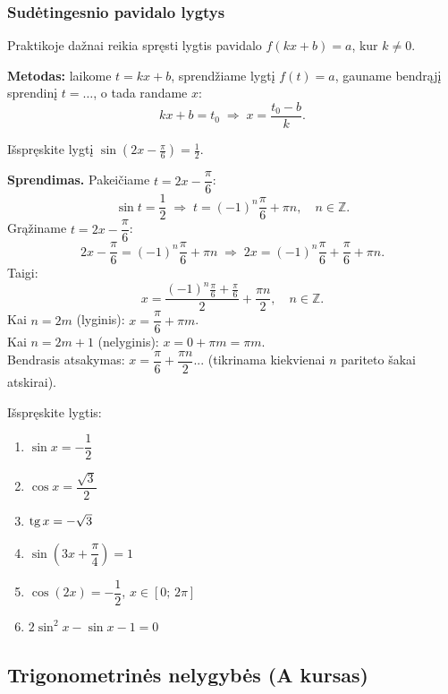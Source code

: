 \subsubsection*{Sudėtingesnio pavidalo lygtys}

Praktikoje dažnai reikia spręsti lygtis pavidalo $f(kx + b) = a$, kur $k \neq 0$.

\noindent \textbf{Metodas:} laikome $t = kx + b$, sprendžiame lygtį $f(t) = a$, 
gauname bendrąjį sprendinį $t = \ldots$, o tada randame $x$:
\[
    kx + b = t_0 \;\Rightarrow\; x = \frac{t_0 - b}{k}.
\]

\begin{example}
Išspręskite lygtį $\sin(2x - \frac{\pi}{6}) = \frac{1}{2}$.

\textbf{Sprendimas.} Pakeičiame $t = 2x - \dfrac{\pi}{6}$:
\[
    \sin t = \frac{1}{2} \;\Rightarrow\; t = (-1)^n\frac{\pi}{6} + \pi n, 
    \quad n \in \mathbb{Z}.
\]
Grąžiname $t = 2x - \dfrac{\pi}{6}$:
\[
    2x - \frac{\pi}{6} = (-1)^n\frac{\pi}{6} + \pi n
    \;\Rightarrow\; 
    2x = (-1)^n\frac{\pi}{6} + \frac{\pi}{6} + \pi n.
\]
Taigi:
\[
    x = \frac{(-1)^n\frac{\pi}{6} + \frac{\pi}{6}}{2} + \frac{\pi n}{2}, 
    \quad n \in \mathbb{Z}.
\]
Kai $n = 2m$ (lyginis): $x = \dfrac{\pi}{6} + \pi m$. \\
Kai $n = 2m+1$ (nelyginis): $x = 0 + \pi m = \pi m$. \\
Bendrasis atsakymas: $x = \dfrac{\pi}{6} + \dfrac{\pi n}{2}$... (tikrinama kiekvienai 
$n$ pariteto šakai atskirai).
\end{example}

\begin{exercise}
Išspręskite lygtis:
\begin{enumerate}[label=\alph*)]
    \item $\sin x = -\dfrac{1}{2}$
    \item $\cos x = \dfrac{\sqrt{3}}{2}$
    \item $\operatorname{tg} x = -\sqrt{3}$
    \item $\sin\!\left(3x + \dfrac{\pi}{4}\right) = 1$
    \item $\cos(2x) = -\dfrac{1}{2}$, $x \in [0;\, 2\pi]$
    \item $2\sin^2 x - \sin x - 1 = 0$
\end{enumerate}
\end{exercise}

\subsection{Trigonometrinės nelygybės (A kursas)}

